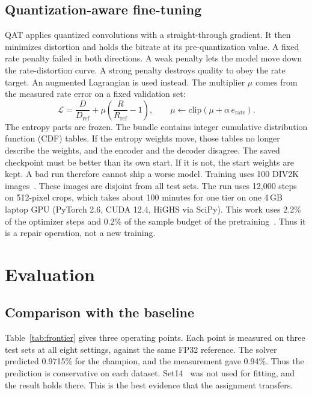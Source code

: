 \documentclass[10pt,twocolumn]{article}
\begin{document}
\subsection{Quantization-aware fine-tuning}
QAT applies quantized convolutions with a straight-through gradient. It then minimizes distortion and
holds the bitrate at its pre-quantization value.
A fixed rate penalty failed in both directions. A weak penalty lets the model move down the
rate-distortion curve. A strong penalty destroys quality to obey the rate target. An augmented
Lagrangian is used instead. The multiplier $\mu$ comes from the measured rate error on a fixed validation set:
\begin{equation*}
\mathcal{L}=\frac{D}{D_{\text{ref}}}+\mu\left(\frac{R}{R_{\text{ref}}}-1\right),\qquad
\mu\leftarrow\mathrm{clip}\!\left(\mu+\alpha\,e_{\text{rate}}\right).
\end{equation*}
The entropy parts are frozen. The bundle contains integer cumulative distribution function (CDF) tables.
If the entropy weights move, those tables no longer describe the weights, and the encoder and the
decoder disagree.
The saved checkpoint must be better than its own start. If it is not, the start weights are kept. A bad
run therefore cannot ship a worse model.
Training uses 100 DIV2K images~\cite{div2k}. These images are disjoint from all test sets. The run uses 12,000
steps on 512-pixel crops, which takes about 100 minutes for one tier on one 4\,GB laptop GPU (PyTorch
2.6, CUDA 12.4, HiGHS via SciPy). This work uses 2.2\% of the optimizer steps and 0.2\% of the sample
budget of the pretraining~\cite{pulse}. Thus it is a repair operation, not a new training.

\section{Evaluation}
\subsection{Comparison with the baseline}
Table~\ref{tab:frontier} gives three operating points. Each point is measured on three test sets at all
eight settings, against the same FP32 reference.
The solver predicted 0.9715\% for the champion, and the measurement gave 0.94\%. Thus the prediction is
conservative on each dataset. Set14~\cite{set14} was not used for fitting, and the result holds there.
This is the best evidence that the assignment transfers.
\end{document}
